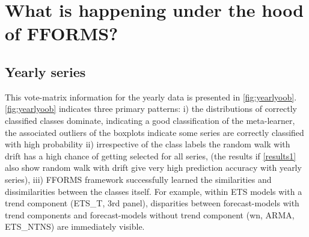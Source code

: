 \documentclass[11pt,a4paper,]{article}
\begin{document}
\hypertarget{results2}{%
\section{What is happening under the hood of FFORMS?}\label{results2}}

\hypertarget{yearly-series}{%
\subsection{Yearly series}\label{yearly-series}}

This vote-matrix information for the yearly data is presented in \autoref{fig:yearlyoob}. \autoref{fig:yearlyoob} indicates three primary patterns: i) the distributions of correctly classified classes dominate, indicating a good classification of the meta-learner, the associated outliers of the boxplots indicate some series are correctly classified with high probability ii) irrespective of the class labels the random walk with drift has a high chance of getting selected for all series,
(the results if \autoref{results1} also show random walk with drift give very high prediction accuracy with yearly series), iii) FFORMS framework successfully learned the similarities and dissimilarities between the classes itself. For example, within ETS models with a trend component (ETS\_T, 3rd panel), disparities between forecast-models with trend components and forecast-models without trend component (wn, ARMA, ETS\_NTNS) are immediately visible.
\end{document}
